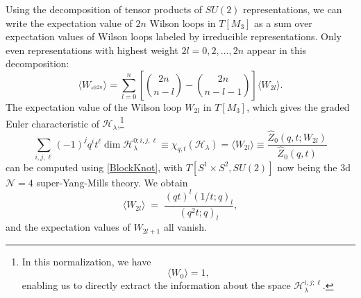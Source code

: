 \documentclass[hyper,letterpaper]{JHEP3}
\newcommand{\be}{\begin{equation}}
\newcommand{\ee}{\end{equation}}
\renewcommand{\hat}{\widehat}
\def\CH{{\mathcal H}}
\def\CN{{\mathcal N}}
\begin{document}
Using the decomposition of tensor products of $SU(2)$ representations, we can write the expectation value of $2n$ Wilson loops in $T[M_3]$
as a sum over expectation values of Wilson loops labeled by irreducible representations. Only even representations with highest weight $2l=0,2,\ldots,2n$ appear in this decomposition:
\be\label{WilsonDec1}
\langle W_{{\square}^{\otimes 2n}}\rangle =\sum_{l=0}^n \left[{{2n}\choose {n-l}}-{{2n}\choose {n-l-1}}\right] \langle W_{2l}\rangle.
\ee
The expectation value of the Wilson loop $W_{2l}$ in $T[M_3]$,
which gives the graded Euler characteristic of $\CH_\lambda$,\footnote{In this normalization, we have
\be\label{WilsonNorm}
\langle W_0\rangle=1,
\ee
enabling us to directly extract the information about the space $\CH_{\lambda}^{i,j;\ell}$.}
\be
\sum_{i,j,\ell}(-1)^jq^it^\ell\dim\CH_\lambda^{0;i,j,\ell} \equiv\chi_{q,t}(\CH_\lambda)=\langle W_{2l}\rangle\equiv \frac{\hat{Z}_0(q,t;W_{2l})}{\hat{Z}_0(q,t)}
\ee
can be computed using \eqref{BlockKnot}, with $T[S^1\times S^2,SU(2)]$ now being the 3d $\CN=4$ super-Yang-Mills theory.
We obtain
\begin{equation}
	\langle W_{2l}\rangle \; = \; \frac{(qt)^{l} (1/t;q)_l}{(q^2t;q)_l},
\end{equation}
and the expectation values of $W_{2l+1}$ all vanish.
\end{document}
